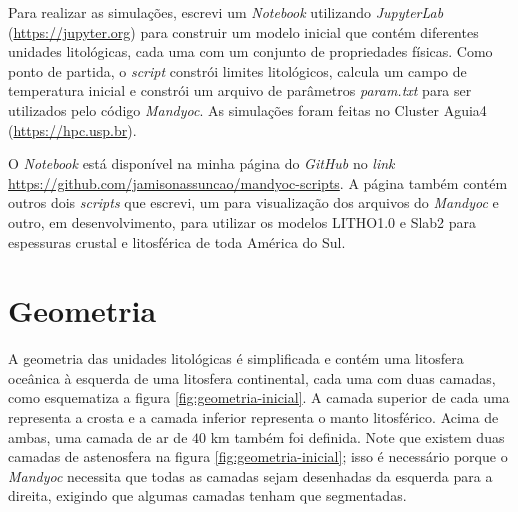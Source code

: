 

%  

Para realizar as simulações, escrevi um \textit{Notebook} utilizando \textit{JupyterLab} (\url{https://jupyter.org}) para construir um modelo inicial que contém diferentes unidades litológicas, cada uma com um conjunto de propriedades físicas. Como ponto de partida, o \textit{script} constrói limites litológicos, calcula um campo de temperatura inicial e constrói um arquivo de parâmetros \textit{param.txt} para ser utilizados pelo código \textit{Mandyoc}. As simulações foram feitas no Cluster Aguia4 (\url{https://hpc.usp.br}).

O \textit{Notebook} está disponível na minha página do \textit{GitHub} no \textit{link} \url{https://github.com/jamisonassuncao/mandyoc-scripts}. A página também contém outros dois \textit{scripts} que escrevi, um para visualização dos arquivos do \textit{Mandyoc} e outro, em desenvolvimento, para utilizar os modelos LITHO1.0 \citep{pasyanos2014litho1} e Slab2 \citep{hayes2018slab2} para espessuras crustal e litosférica de toda América do Sul.


\section{Geometria}

A geometria das unidades litológicas é simplificada e contém uma litosfera oceânica à esquerda de uma litosfera continental, cada uma com duas camadas, como esquematiza a figura \ref{fig:geometria-inicial}. A camada superior de cada uma representa a crosta e a camada inferior representa o manto litosférico. Acima de ambas, uma camada de ar de $40$ km também foi definida. Note que existem duas camadas de astenosfera na figura \ref{fig:geometria-inicial}; isso é necessário porque o \textit{Mandyoc} necessita que todas as camadas sejam desenhadas da esquerda para a direita, exigindo que algumas camadas tenham que segmentadas.

